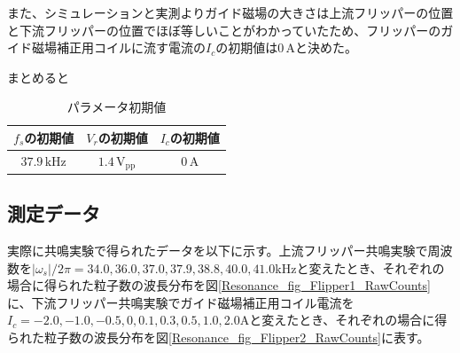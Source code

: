 また、シミュレーションと実測よりガイド磁場の大きさは上流フリッパーの位置と下流フリッパーの位置でほぼ等しいことがわかっていたため、フリッパーのガイド磁場補正用コイルに流す電流の$I_c$の初期値は$0\,\mathrm{A}$と決めた。

まとめると
\begin{table}[h]
\centering
\caption{パラメータ初期値}
\begin{tabular}{ccc}
$f_s$の初期値&$V_r$の初期値&$I_c$の初期値 \\ \hline
$37.9\,\mathrm{kHz}$&$1.4 \,\mathrm{V_{pp}}$&$0\,\mathrm{A}$
\end{tabular}
\end{table}

\subsection{測定データ}
実際に共鳴実験で得られたデータを以下に示す。上流フリッパー共鳴実験で周波数を$|\omega_s|/2\pi=34.0,36.0,37.0,37.9,38.8,40.0,41.0$kHzと変えたとき、それぞれの場合に得られた粒子数の波長分布を図\ref{Resonance_fig_Flipper1_RawCounts}に、下流フリッパー共鳴実験でガイド磁場補正用コイル電流を$I_c=-2.0,-1.0,-0.5,0,0.1,0.3,0.5,1.0,2.0$Aと変えたとき、それぞれの場合に得られた粒子数の波長分布を図\ref{Resonance_fig_Flipper2_RawCounts}に表す。

